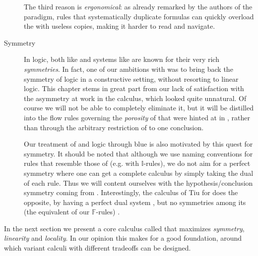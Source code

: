 \begin{scope}
\begin{scope}
\begin{description}
    The third reason is \emph{ergonomical}: as already remarked by the authors
    of the  paradigm,
    rules that systematically duplicate formulas can quickly overload the
     with useless copies, making it harder to read and navigate.
  \item[Symmetry] 
    In  logic, both  like  and  systems like  are known for their very rich
    \emph{symmetries}. In fact, one of our ambitions with  was to
    bring back the symmetry of  logic in a constructive setting,
    without resorting to linear logic. This chapter stems in great part from our
    lack of satisfaction with the asymmetry at work in the  calculus,
    which looked quite unnatural. Of course we will not be able to completely
    eliminate it, but it will be distilled into the flow rules governing the
    \emph{porosity} of  that were hinted at in ,
    rather than through the arbitrary restriction of  to one
    conclusion.
    
    Our treatment of  and  logic
    through blue  is also motivated by this quest for symmetry. It
    should be noted that although we use naming conventions for rules that
    resemble those of  (e.g. with $\mathbb{I}$-rules), we do not aim for
    a perfect symmetry where one can get a complete calculus by simply taking
    the dual of each rule. Thus we will content ourselves with the
    hypothesis/conclusion symmetry coming from .
    Interestingly, the calculus  of Tiu for 
     does the opposite, by having a perfect dual system
    , but no symmetries among its  (the equivalent of
    our $\mathbb{F}$-rules) .
\end{description}

In the next section we present a core calculus called  that
maximizes \emph{symmetry}, \emph{linearity} and \emph{locality}. In our opinion
this makes for a good  foundation, around which variant
calculi with different tradeoffs can be designed.


\end{scope}
\end{scope}
